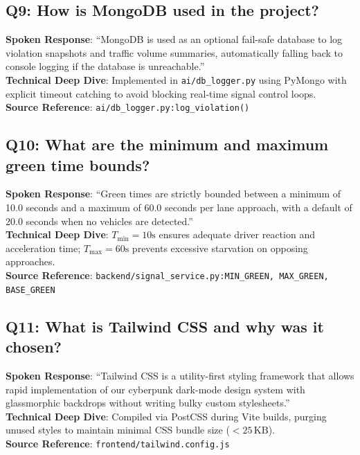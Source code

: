 \subsection*{Q9: How is MongoDB used in the project?}
\begin{interviewbox}
\textbf{Spoken Response}: ``MongoDB is used as an optional fail-safe database to log violation snapshots and traffic volume summaries, automatically falling back to console logging if the database is unreachable.''\\
\textbf{Technical Deep Dive}: Implemented in \texttt{ai/db\_logger.py} using PyMongo with explicit timeout catching to avoid blocking real-time signal control loops.\\
\textbf{Source Reference}: \texttt{ai/db\_logger.py:log\_violation()}
\end{interviewbox}

\subsection*{Q10: What are the minimum and maximum green time bounds?}
\begin{interviewbox}
\textbf{Spoken Response}: ``Green times are strictly bounded between a minimum of 10.0 seconds and a maximum of 60.0 seconds per lane approach, with a default of 20.0 seconds when no vehicles are detected.''\\
\textbf{Technical Deep Dive}: $T_{\text{min}} = 10\text{s}$ ensures adequate driver reaction and acceleration time; $T_{\text{max}} = 60\text{s}$ prevents excessive starvation on opposing approaches.\\
\textbf{Source Reference}: \texttt{backend/signal\_service.py:MIN\_GREEN, MAX\_GREEN, BASE\_GREEN}
\end{interviewbox}

\subsection*{Q11: What is Tailwind CSS and why was it chosen?}
\begin{interviewbox}
\textbf{Spoken Response}: ``Tailwind CSS is a utility-first styling framework that allows rapid implementation of our cyberpunk dark-mode design system with glassmorphic backdrops without writing bulky custom stylesheets.''\\
\textbf{Technical Deep Dive}: Compiled via PostCSS during Vite builds, purging unused styles to maintain minimal CSS bundle size ($< 25\,\text{KB}$).\\
\textbf{Source Reference}: \texttt{frontend/tailwind.config.js}
\end{interviewbox}

